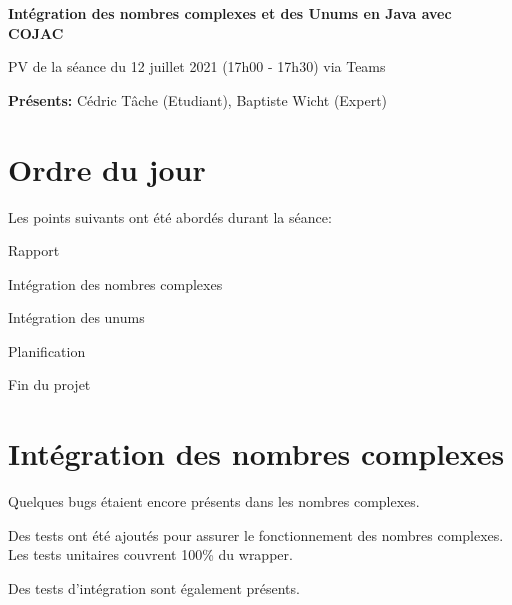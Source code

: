 \documentclass[11pt]{meetingmins}
\date{12 juillet 2021}
\begin{document}
\begin {center} {
    \large \textbf {Intégration des nombres complexes et des Unums en Java avec COJAC}
}
\vspace {0.5ex}

PV de la séance du 12 juillet 2021 (17h00 - 17h30) via Teams
\end {center} \vspace {1.5em}

\noindent
\textbf{Présents:} Cédric Tâche (Etudiant), Baptiste Wicht (Expert)

\section{Ordre du jour}
Les points suivants ont été abordés durant la séance:
\begin{hiddenitems}
    \item Rapport
    \item Intégration des nombres complexes
    \item Intégration des unums
    \item Planification
    \item Fin du projet
\end{hiddenitems}

\section{Intégration des nombres complexes}
\begin{hiddenitems}
    \item Quelques bugs étaient encore présents dans les nombres complexes.
    \item Des tests ont été ajoutés pour assurer le fonctionnement des nombres complexes. Les tests unitaires couvrent 100\% du wrapper.
    \item Des tests d'intégration sont également présents.
\end{hiddenitems}
\end{document}
